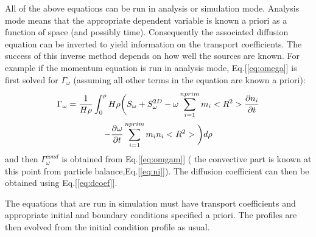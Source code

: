 \begin{slide}
\begin{itemize}
        All of the above equations can be run in analysis or simulation
        mode. Analysis mode means that the appropriate dependent variable
        is known a priori as a function of space (and possibly time). 
        Consequently the associated diffusion equation can be inverted
        to yield information on the transport coefficients. The success of 
        this inverse method depends on how well the sources are known.
        For 
        example if the
        momentum equation is run in analysis mode, Eq.[\ref{eq:omega}] is
        first solved for $\Gamma_\omega $ (assuming all other terms in
         the equation
        are known a priori):
          \begin{multline}
             \Gamma_\omega =\frac{1}{H\rho}\int_0^\rho H\rho\bigg(
                             S_\omega +S_\omega^{2D}
                         -\omega\sum_{i=1}^{nprim}m_i<R^2>\frac{\partial{ n_i}}{\partial{ t}} \\
             - \frac{\partial{ \omega}}{\partial{ t}}\sum_{i=1}^{nprim}m_i n_i<R^2> \bigg)d\rho
          \end{multline}
           and then   $\Gamma_\omega^{cond} $ is obtained from 
            Eq.[\ref{eq:omgam}] ( the convective part is known at this point
            from particle balance,Eq.[\ref{eq:ni}]). The diffusion 
            coefficient can then be obtained using Eq.[\ref{eq:dcoef}].

        The equations that are run in simulation must have 
        transport coefficients
        and appropriate initial and boundary conditions specified a priori.
        The profiles are then evolved from the initial condition profile as
        usual. 
    \end{itemize}
    \end{slide}

 
